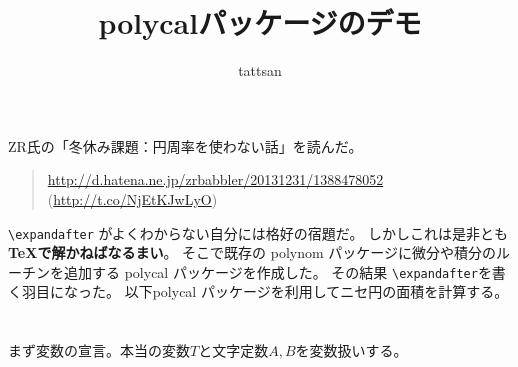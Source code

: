 \documentclass{jsarticle}
\title{\textsf{polycal}パッケージのデモ}\author{tattsan}\date{}
\begin{document}
\maketitle

\section{}
ZR氏の「冬休み課題：円周率を使わない話」を読んだ。
\begin{quote}
  \url{http://d.hatena.ne.jp/zrbabbler/20131231/1388478052}
  (\url{http://t.co/NjEtKJwLyO})
\end{quote}
\verb+\expandafter+  がよくわからない自分には格好の宿題だ。
しかしこれは是非とも\textbf{\TeX で解かねばなるまい}。
そこで既存の \textsf{polynom} パッケージに微分や積分のルーチンを追加する
\textsf{polycal} パッケージを作成した。
その結果 \verb|\expandafter|を書く羽目になった。
以下\textsf{polycal} パッケージを利用してニセ円の面積を計算する。
\section{}
まず変数の宣言。本当の変数$T$と文字定数$A,B$を変数扱いする。
\end{document}
